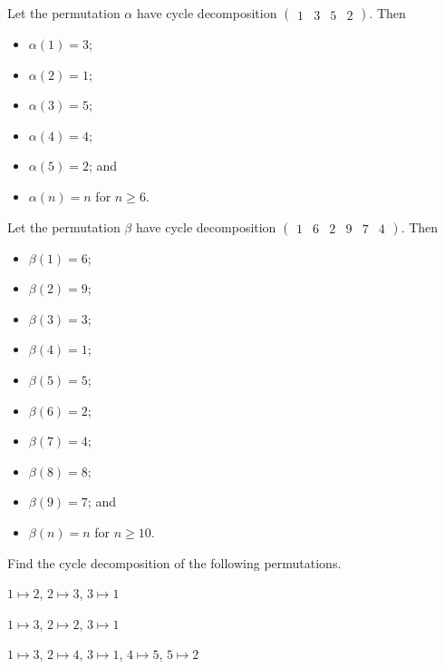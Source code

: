 \begin{example}
    Let the permutation $\alpha$ have cycle decomposition $\begin{pmatrix}1 & 3 & 5 & 2\end{pmatrix}$. Then
    \begin{multicols}{3}
        \begin{itemize}
            \item $\alpha(1) = 3$;
            \item $\alpha(2) = 1$;
            \item $\alpha(3) = 5$;
            \item $\alpha(4) = 4$;
            \item $\alpha(5) = 2$; and
            \item $\alpha(n) = n$ for $n \geq 6$.
        \end{itemize}
    \end{multicols}
\end{example}

\begin{example}
    Let the permutation $\beta$ have cycle decomposition $\begin{pmatrix}1 & 6 & 2 & 9 & 7 & 4\end{pmatrix}$. Then
    \begin{multicols}{3}
        \begin{itemize}
            \item $\beta(1) = 6$;
            \item $\beta(2) = 9$;
            \item $\beta(3) = 3$;
            \item $\beta(4) = 1$;
            \item $\beta(5) = 5$;
            \item $\beta(6) = 2$;
            \item $\beta(7) = 4$;
            \item $\beta(8) = 8$;
            \item $\beta(9) = 7$; and
            \item $\beta(n) = n$ for $n \geq 10$.
        \end{itemize}
    \end{multicols}
\end{example}

\begin{exercise}
    Find the cycle decomposition of the following permutations.
    \begin{partquestions}{\alph*}
        \item $1 \mapsto 2$, $2 \mapsto 3$, $3 \mapsto 1$
        \item $1 \mapsto 3$, $2 \mapsto 2$, $3 \mapsto 1$
        \item $1 \mapsto 3$, $2 \mapsto 4$, $3 \mapsto 1$, $4 \mapsto 5$, $5 \mapsto 2$
    \end{partquestions}
\end{exercise}

